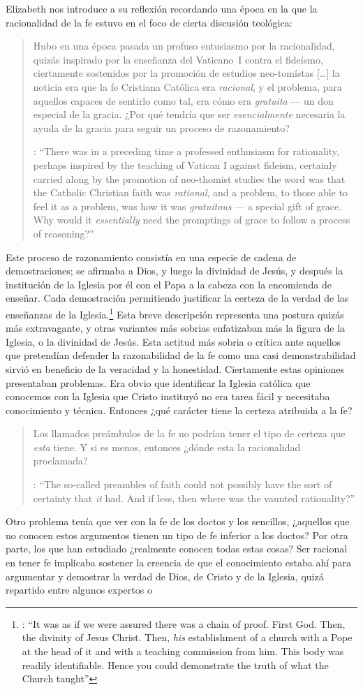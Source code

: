 Elizabeth nos introduce a su reflexión recordando una época en la que la racionalidad de la fe estuvo en el foco de cierta discusión teológica: \blockquote[{\cite[113]{anscombe1981erp:faith}}: \enquote{There was in a preceding time a professed enthusiasm for rationality, perhaps inspired by the teaching of Vatican I against fideism, certainly carried along by the promotion of neo-thomist studies \textelp{} the word was that the Catholic Christian faith was \emph{rational}, and a problem, to those able to feel it as a problem, was how it was \emph{gratuitous} --- a special gift of grace. Why would it \emph{essentially} need the promptings of grace to follow a process of reasoning?}]{Hubo en una época pasada un profuso entusiasmo por la racionalidad, quizás inspirado por la enseñanza del Vaticano~I contra el fideísmo, ciertamente sostenidos por la promoción de estudios neo-tomístas [\ldots] la noticia era que la fe Cristiana Católica era \emph{racional}, y el problema, para aquellos capaces de sentirlo como tal, era cómo era \emph{gratuita} --- un don especial de la gracia. ¿Por qué tendría que ser \emph{esencialmente} necesaria la ayuda de la gracia para seguir un proceso de razonamiento?}. Este proceso de razonamiento consistía en una especie de cadena de demostraciones; se afirmaba a Dios, y luego la divinidad de Jesús, y después la institución de la Iglesia por él con el Papa a la cabeza con la encomienda de enseñar. Cada demostración permitiendo justificar la certeza de la verdad de las enseñanzas de la Iglesia.\footnote{\cite[Cf.~][12]{anscombe1981erp:faith}: \enquote{It was as if we were assured there was a chain of proof. First God. Then, the divinity of Jesus Christ. Then, \emph{his} establishment of a church with a Pope at the head of it and with a teaching commission from him. This body was readily identifiable. Hence you could demonstrate the truth of what the Church taught}} Esta breve descripción representa una postura quizás más extravagante, y otras variantes más sobrias enfatizaban más la figura de la Iglesia, o la divinidad de Jesús. Esta actitud más sobria o crítica ante aquellos que pretendían defender la razonabilidad de la fe como una casi demonstrabilidad sirvió en beneficio de la veracidad y la honestidad. Ciertamente estas opiniones presentaban problemas. Era obvio que identificar la Iglesia católica que conocemos con la Iglesia que Cristo instituyó no era tarea fácil y necesitaba conocimiento y técnica. Entonces ¿qué carácter tiene la certeza atribuida a la fe? \blockquote[{\cite[114]{anscombe1981erp:faith}}: \enquote{The so-called preambles of faith could not possibly have the sort of certainty that \emph{it} had. And if less, then where was the vaunted rationality?}]{Los llamados preámbulos de la fe no podrían tener el tipo de certeza que \emph{esta} tiene. Y si es menos, entonces ¿dónde esta la racionalidad proclamada?}. Otro problema tenía que ver con la fe de los doctos y los sencillos, ¿aquellos que no conocen estos argumentos tienen un tipo de fe inferior a los doctos? Por otra parte, los que han estudiado ¿realmente conocen todas estas cosas? Ser racional en tener fe implicaba sostener la creencia de que el conocimiento estaba ahí para argumentar y demostrar la verdad de Dios, de Cristo y de la Iglesia, quizá repartido entre algunos expertos o 